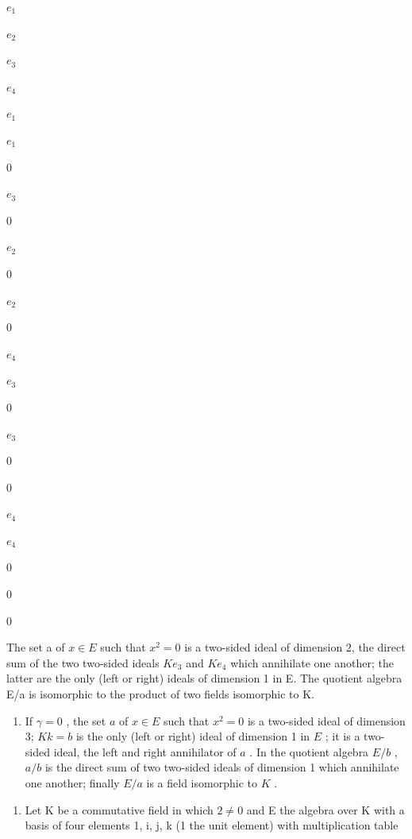 \(e_1\)

\(e_2\)

\(e_3\)

\(e_4\)

\(e_1\)

\(e_1\)

0

\(e_3\)

0

\(e_2\)

0

\(e_2\)

0

\(e_4\)

\(e_3\)

0

\(e_3\)

0

0

\(e_4\)

\(e_4\)

0

0

0

The set a of \(x \in E\) such that \(x^{2} = 0\) is a two-sided ideal of dimension 2, the direct sum of the two two-sided ideals \(Ke_{3}\) and \(Ke_{4}\) which annihilate one another; the latter are the only (left or right) ideals of dimension 1 in E. The quotient algebra E/a is isomorphic to the product of two fields isomorphic to K.

\begin{enumerate}
\def\labelenumi{(\alph{enumi})}
\setcounter{enumi}{2}
\tightlist
\item
  If \(\gamma = 0\) , the set \(a\) of \(x \in E\) such that \(x^2 = 0\) is a two-sided ideal of dimension 3; \(Kk = b\) is the only (left or right) ideal of dimension 1 in \(E\) ; it is a two-sided ideal, the left and right annihilator of \(a\) . In the quotient algebra \(E/b\) , \(a/b\) is the direct sum of two two-sided ideals of dimension 1 which annihilate one another; finally \(E/a\) is a field isomorphic to \(K\) .
\end{enumerate}

\begin{enumerate}
\def\labelenumi{\arabic{enumi}.}
\setcounter{enumi}{6}
\tightlist
\item
  Let K be a commutative field in which \(2 \neq 0\) and E the algebra over K with a basis of four elements 1, i, j, k (1 the unit element) with multiplication table
\end{enumerate}

